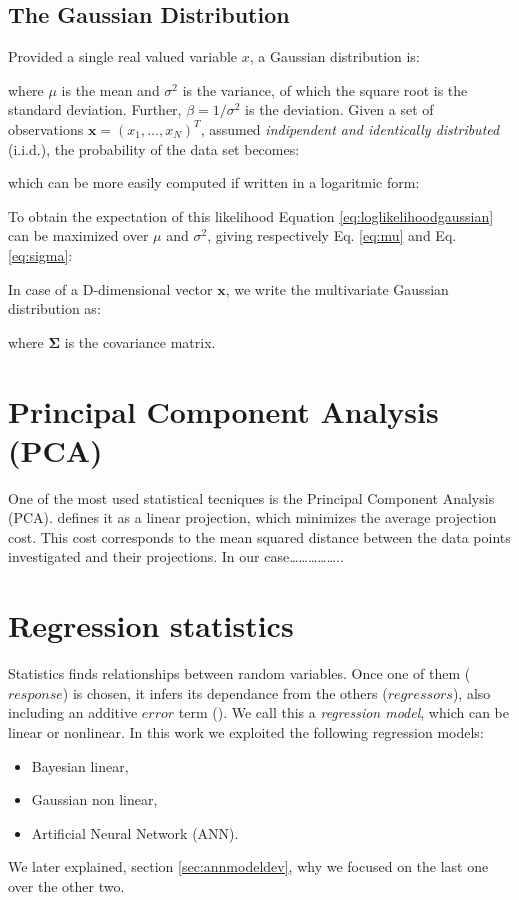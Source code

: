 \subsection{The Gaussian Distribution}
\label{subsec:gaussian}

Provided a single real valued variable $x$, a Gaussian distribution is:

where $\mu$ is the mean and $\sigma^2$ is the variance, of which the square root
is the standard deviation.
Further, $\beta = 1/\sigma^2$ is the deviation.
Given a set of observations $\mathbf{x} = (x_1, \ldots, x_N)^T$, assumed
\textit{indipendent and identically distributed} (i.i.d.), the probability of
the data set becomes:

which can be more easily computed if written in a logaritmic form:

To obtain the expectation of this likelihood Equation
\ref{eq:loglikelihoodgaussian} can be maximized over $\mu$ and $\sigma^2$,
giving respectively Eq. \ref{eq:mu} and Eq. \ref{eq:sigma}:


In case of a D-dimensional vector $\mathbf{x}$, we write the multivariate
Gaussian distribution as:

where $\mathbf{\Sigma}$ is the covariance matrix.

\section{Principal Component Analysis (PCA)}
\label{sec:pca}

One of the most used statistical tecniques is the Principal Component Analysis
(PCA).
\citet{RefWorks:194} defines it as a linear projection, which minimizes the
average projection cost.
This cost corresponds to the mean squared distance between the data
points investigated and their projections.
In our case\ldots\ldots\ldots\ldots\ldots..

\section{Regression statistics}
\label{sec:regressionstatistics}

Statistics finds relationships between random variables.
Once one of them ($response$) is chosen, it infers its dependance from the
others ($regressors$), also including an additive $error$ term
(\citet{RefWorks:194}). We call this a \textit{regression model}, which can be
linear or nonlinear.
In this work we exploited the following regression models:
\begin{itemize}
  \item{Bayesian linear,}
  \item{Gaussian non linear,}
  \item{Artificial Neural Network (\acs{ANN}).}
\end{itemize}
We later explained, section \ref{sec:annmodeldev}, why we focused on the last
one over the other two.

